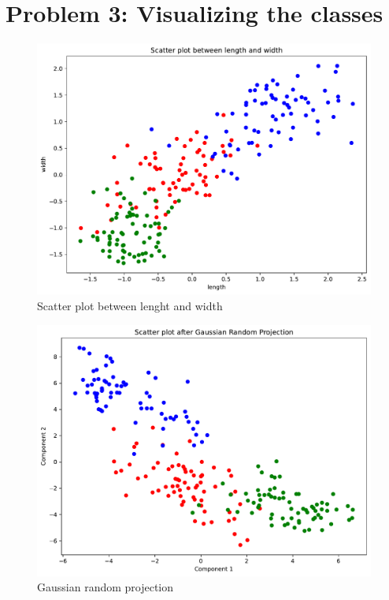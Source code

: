 \documentclass[a4paper]{article}
\begin{document}
\section*{Problem 3: Visualizing the classes}

\begin{figure}[H]
  \begin{center}
    \includegraphics[width=\textwidth]{ola/feature.pdf}
    \caption{Scatter plot between lenght and width}
    \label{fig:feature}
  \end{center}
\end{figure}

\begin{figure}[H]
  \begin{center}
    \includegraphics[width=\textwidth]{ola/gaussian_random_projection.pdf}
    \caption{Gaussian random projection}
    \label{fig:gaussian_random_projection}
  \end{center}
\end{figure}
\end{document}
